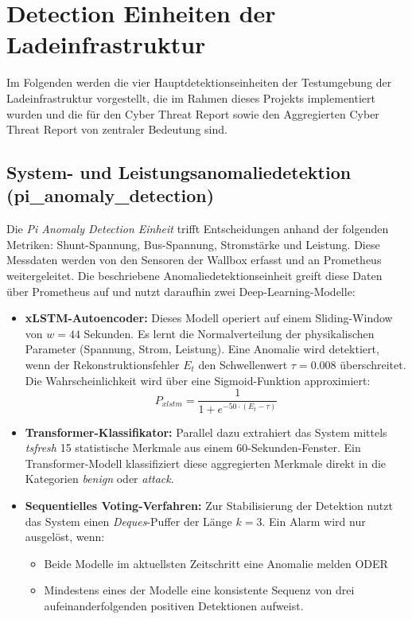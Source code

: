 \section{Detection Einheiten der Ladeinfrastruktur}
\label{sec:detection_einheiten_der_ladeinfrastruktur}

Im Folgenden werden die vier Hauptdetektionseinheiten der Testumgebung der Ladeinfrastruktur vorgestellt, die im Rahmen dieses Projekts implementiert wurden und die für den Cyber Threat Report sowie den Aggregierten Cyber Threat Report von zentraler Bedeutung sind.

    \subsection{System- und Leistungsanomaliedetektion (pi\_anomaly\_detection)}
    \label{subsec:System_und_Leistungsanomaliedetektion}
    Die \textit{Pi Anomaly Detection Einheit} trifft Entscheidungen anhand der folgenden Metriken: Shunt-Spannung, Bus-Spannung, Stromstärke und Leistung. Diese Messdaten werden von den Sensoren der Wallbox erfasst und an Prometheus weitergeleitet. Die beschriebene Anomaliedetektionseinheit greift diese Daten über Prometheus auf und nutzt daraufhin zwei Deep-Learning-Modelle:
    \begin{itemize}
        \item \textbf{xLSTM-Autoencoder:} Dieses Modell operiert auf einem Sliding-Window von $w=44$ Sekunden. Es lernt die Normalverteilung der physikalischen Parameter (Spannung, Strom, Leistung). Eine Anomalie wird detektiert, wenn der Rekonstruktionsfehler $E_t$ den Schwellenwert $\tau = 0.008$ überschreitet. Die Wahrscheinlichkeit wird über eine Sigmoid-Funktion approximiert:
        \[ P_{xlstm} = \frac{1}{1 + e^{-50 \cdot (E_t - \tau)}} \]
        \item \textbf{Transformer-Klassifikator:} Parallel dazu extrahiert das System mittels \textit{tsfresh} 15 statistische Merkmale aus einem 60-Sekunden-Fenster. Ein Transformer-Modell klassifiziert diese aggregierten Merkmale direkt in die Kategorien \textit{benign} oder \textit{attack}.
        \item \textbf{Sequentielles Voting-Verfahren:} Zur Stabilisierung der Detektion nutzt das System einen \textit{Deques}-Puffer der Länge $k=3$. Ein Alarm wird nur ausgelöst, wenn:
        \begin{itemize}
            \item Beide Modelle im aktuellsten Zeitschritt eine Anomalie melden ODER
            \item Mindestens eines der Modelle eine konsistente Sequenz von drei aufeinanderfolgenden positiven Detektionen aufweist.
        \end{itemize}
    \end{itemize}
    
